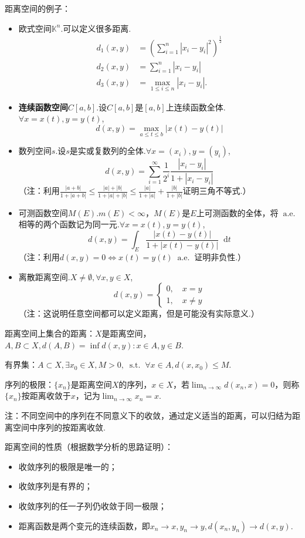 \documentclass[bwprint, withoutpreface]{cumcmthesis}
\newcommand*{\st}{\mathop{}\!\mathrm{s.t.}\!\mathop{}}
\newcommand*{\aev}{\mathop{}\!\mathrm{a.e.}\!\mathop{}}
\newcommand*{\dif}{\mathop{}\!\mathrm{d}}
\begin{document}
距离空间的例子：
\begin{itemize}[itemindent=2em]
	\item 欧式空间$\mathbb{K}^n$.可以定义很多距离.
	\begin{align*}
		d_1(x, y) & = (\sum_{i = 1}^{n}{|x_i - y_i|^2})^{\frac{1}{2}} \\
		d_2(x, y) & = \sum_{i = 1}^{n}{|x_i - y_i|} \\
		d_3(x, y) & = \max_{1 \leqslant i \leqslant n}{|x_i - y_i|}.
	\end{align*}
	\item \textbf{连续函数空间}$C[a, b]$.设$C[a, b]$是$[a, b]$上连续函数全体.$\forall x = x(t), y = y(t)$,\[d(x, y) = \max_{a \leqslant t \leqslant b}{|x(t) - y(t)|}\] 
	\item 数列空间$s$.设$s$是实或复数列的全体.$\forall x = (x_i), y = (y_i)$,\[d(x, y) = \sum_{i = 1}^{\infty}{\frac{1}{2^i} \frac{|x_i - y_i|}{1 + |x_i - y_i|}}\]
	（注：利用$\frac{|a + b|}{1 + |a + b|} \leqslant \frac{|a| + |b|}{1 + |a| + |b|} \leqslant \frac{|a|}{1 + |a|} + \frac{|b|}{1 + |b|}$证明三角不等式.）
	\item 可测函数空间$M(E)$.$m(E) < \infty$，$M(E)$是$E$上可测函数的全体，将$\aev$相等的两个函数记为同一元.$\forall x = x(t), y = y(t)$,\[d(x, y) = \int_E \frac{|x(t) - y(t)|}{1 + |x(t) - y(t)|} \dif t\]
	（注：利用$d(x, y) = 0 \iff x(t) = y(t) \aev$证明非负性.）
	\item 离散距离空间.$X \neq \emptyset, \forall x, y \in X$,
	\begin{equation*}
		d(x, y) = 
		\begin{cases}
			0, \quad x = y \\
			1, \quad x \neq y
		\end{cases}
	\end{equation*}
	（注：这说明任意空间都可以定义距离，但是可能没有实际意义.）
\end{itemize}

距离空间上集合的距离：$X$是距离空间，$A, B \subset X, d(A, B) = \inf{d(x, y): x \in A, y \in B}$.

有界集：$A \subset X, \exists x_0 \in X, M > 0, \st \forall x \in A, d(x, x_0) \leqslant M$.

序列的极限：$\{x_n\}$是距离空间$X$的序列，$x \in X$，若$\lim_{n \to \infty}{d(x_n, x)} = 0$，则称$\{x_n\}$按距离收敛于$x$，记为$\lim_{n \to \infty}{x_n} = x$.

注：不同空间中的序列在不同意义下的收敛，通过定义适当的距离，可以归结为距离空间中序列的按距离收敛.

距离空间的性质（根据数学分析的思路证明）：
\begin{itemize}[itemindent=2em]
	\item 收敛序列的极限是唯一的；
	\item 收敛序列是有界的；
	\item 收敛序列的任一子列仍收敛于同一极限；
	\item 距离函数是两个变元的连续函数，即$x_n \to x, y_n \to y, d(x_n, y_n) \to d(x, y)$.
\end{itemize}
\end{document}
